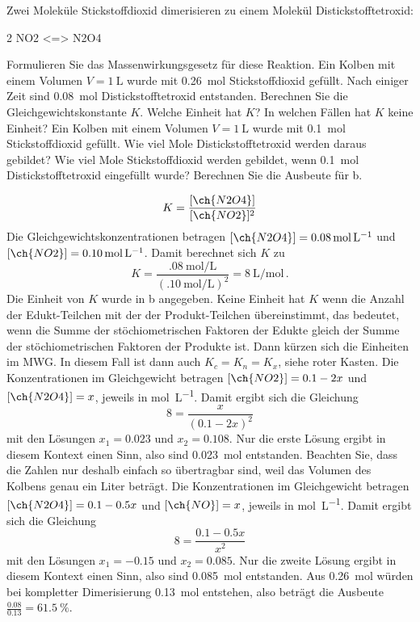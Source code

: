 \documentclass[DIV11]{scrartcl}
\begin{document}
\begin{question}[name=Dimerisierung von Stickstoffdioxid]
Zwei Moleküle Stickstoffdioxid dimerisieren zu einem Molekül
Distickstofftetroxid:
\begin{reaction*}
 2 NO2 <=> N2O4
\end{reaction*}
\begin{tasks}
  \task Formulieren Sie das Massenwirkungsgesetz für diese Reaktion.
  \task Ein Kolben mit einem Volumen $V = \SI{1}{\liter}$ wurde mit
    \SI{0.26}{\mole} Stickstoffdioxid gefüllt.  Nach einiger Zeit sind
    \SI{0.08}{\mole} Distickstofftetroxid entstanden.  Berechnen Sie die
    Gleichgewichtskonstante $K$.
  \task Welche Einheit hat $K$?  In welchen Fällen hat $K$ keine Einheit?
  \task Ein Kolben mit einem Volumen $V = \SI{1}{\liter}$ wurde mit
    \SI{0.1}{\mole} Stickstoffdioxid gefüllt.  Wie viel Mole
    Distickstofftetroxid werden daraus gebildet?
  \task Wie viel Mole Stickstoffdioxid werden gebildet, wenn \SI{0.1}{\mole}
    Distickstofftetroxid eingefüllt wurde?
  \task Berechnen Sie die Ausbeute für b.
\end{tasks}
\end{question}
\begin{solution}
  \begin{tasks}
    \task \[ K=\frac{[\ch{N2O4}]}{[\ch{NO2}]^2} \]
    \task Die Gleichgewichtskonzentrationen betragen
      $[\ch{N2O4}]=\SI{.08}{\mole\per\liter}$ und
      $[\ch{NO2}]=\SI{.10}{\mole\per\liter}$.  Damit berechnet sich $K$ zu
      \[
        K = \frac{\SI{.08}{\mole\per\liter}}{(\SI{.10}{\mole\per\liter})^2}
          = \SI{8}{\liter\per\mole} \,.
      \]
    \task Die Einheit von $K$ wurde in b angegeben.  Keine Einheit hat $K$
      wenn  die Anzahl der Edukt-Teilchen mit der der Produkt-Teilchen
      übereinstimmt, das bedeutet, wenn die Summe der stöchiometrischen
      Faktoren der Edukte gleich der Summe der stöchiometrischen Faktoren der
      Produkte ist.  Dann kürzen sich die Einheiten im MWG.  In diesem Fall
      ist dann auch $K_c = K_n = K_x$, siehe roter Kasten.
    \task Die Konzentrationen im Gleichgewicht betragen $[\ch{NO2}]=0.1-2x$
      und $[\ch{N2O4}]=x$, jeweils in \si{\mole\per\liter}.  Damit ergibt sich
      die Gleichung \[ 8 = \frac{x}{(0.1-2x)^2} \] mit den Lösungen $x_1=0.023$
      und $x_2=0.108$. Nur die erste Lösung ergibt in diesem Kontext einen
      Sinn, also sind \SI{0.023}{\mole}  entstanden.  Beachten Sie,
      dass die Zahlen nur deshalb einfach so übertragbar sind, weil das
      Volumen des Kolbens genau ein Liter beträgt.
    \task Die Konzentrationen im Gleichgewicht betragen $[\ch{N2O4}]=0.1-0.5x$
      und $[\ch{NO}]=x$, jeweils in \si{\mole\per\liter}.  Damit ergibt sich
      die Gleichung \[ 8 = \frac{0.1-0.5x}{x^2} \] mit den Lösungen $x_1=-0.15$
      und $x_2=0.085$. Nur die zweite Lösung ergibt in diesem Kontext einen
      Sinn, also sind \SI{0.085}{\mole}  entstanden.
    \task Aus \SI{0.26}{\mole}  würden bei kompletter Dimerisierung
      \SI{0.13}{\mole}  entstehen, also beträgt die Ausbeute
      $\frac{0.08}{0.13} = \SI{61.5}{\percent}$.
  \end{tasks}
\end{solution}
\end{document}
